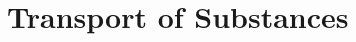 \def\abs#1{\lvert#1\rvert}
\def\argdot{{\hspace{0.18em}\cdot\hspace{0.18em}}}
\def\avg#1{\left\{#1\right\}_\omega}
\def\D{{\tn D}}
\def\div{\operatorname{div}}
\def\Eh{\mathcal E_h}       %
\def\Ehcom{\mathcal E_{h,C}}         %
\def\Ehdir{\mathcal E_{h,D}}         %
\def\Ehint{\mathcal E_{h,I}}       %
\def\grad{\nabla}
\def\jmp#1{[#1]}
\def\n{\vc n}
\def\vc#1{\mathbf{\boldsymbol{#1}}}     %
\def\R{\mathbb R}
\def\sc#1#2{\left(#1,#2\right)}
\def\Th{\mathcal T_h}       %
\def\th{\vartheta}
\def\tn#1{{\mathbb{#1}}}    %
\def\Tr{\operatorname{Tr}}
\def\where{\,|\,}


\section{Transport of Substances}
\label{sc:transport_model}

